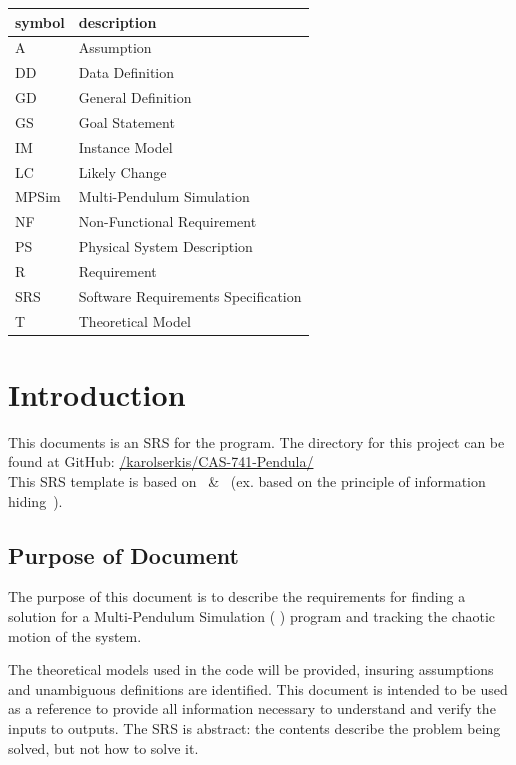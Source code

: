 \documentclass[12pt, titlepage]{article}
\begin{document}
\renewcommand{\arraystretch}{1.2}
\begin{tabular}{l l} 
  \toprule		
  \textbf{symbol} & \textbf{description}\\
  \midrule 
  A & Assumption\\
  DD & Data Definition\\
  GD & General Definition\\
  GS & Goal Statement\\
  IM & Instance Model\\
  LC & Likely Change\\
  MPSim & Multi-Pendulum Simulation\\
  NF & Non-Functional Requirement\\
  PS & Physical System Description\\
  R & Requirement\\
  SRS & Software Requirements Specification\\
  T & Theoretical Model\\
  \bottomrule
\end{tabular}

\newpage


\setcounter{secnumdepth}{3}

\section{Introduction}

This documents is an SRS for the \progname program. The
directory for this project can be found at GitHub:
\href{https://github.com/karolserkis/CAS-741-Pendula/}
{/karolserkis/CAS-741-Pendula/}\\
This SRS template is based on~\citep{SmithAndLai2005} \&~\citep{SmithEtAl2007}
(ex. based on the principle of information hiding~\citep{Parnas1972a}).

\subsection{Purpose of Document}
The purpose of this document is to describe the requirements for finding a 
solution for a Multi-Pendulum Simulation ( \progname) program and tracking the 
chaotic motion of the system. 

The theoretical models used in the \progname code will be provided, insuring
assumptions and unambiguous definitions are identified. This document 
is intended to be used as a reference to provide all information necessary to 
understand and verify the inputs to outputs. The SRS is abstract: the contents 
describe the problem being solved, but not how to solve it.
\end{document}
